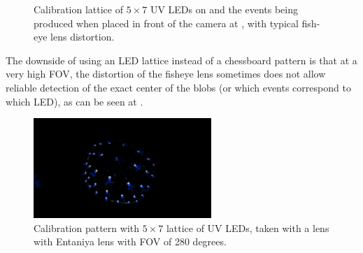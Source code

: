 \begin{figure}[H]
	\centering
	\caption{
		Calibration lattice of $5\times7$ UV LEDs on  and the events being produced when placed in front of the camera at ,
		with typical fish-eye lens distortion.
  }
	\label{fig:lattice}
\end{figure}
The downside of using an LED lattice instead of a chessboard pattern is that at a very high \ac{FOV}, the distortion of the fisheye lens sometimes does not allow
reliable detection of the exact center of the blobs (or which events correspond to which \ac{LED}), as can be seen at .
\begin{figure}[H]
  \centering
  \includegraphics[width=0.6\textwidth]{./fig/photos/lattice_280.png}
  \caption{Calibration pattern with $5\times7$ lattice of UV LEDs, taken with a lens with Entaniya lens with \ac{FOV} of 280 degrees.}
  \label{fig:calibration_pattern_distorted}
\end{figure}

